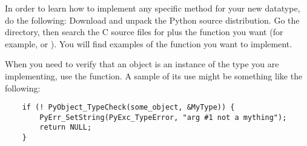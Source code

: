In order to learn how to implement any specific method for your new
datatype, do the following: Download and unpack the Python source
distribution.  Go the  directory, then search the
C source files for  plus the function you want (for
example,  or ).  You will find
examples of the function you want to implement.

When you need to verify that an object is an instance of the type
you are implementing, use the  function.
A sample of its use might be something like the following:

\begin{verbatim}
    if (! PyObject_TypeCheck(some_object, &MyType)) {
        PyErr_SetString(PyExc_TypeError, "arg #1 not a mything");
        return NULL;
    }
\end{verbatim}
